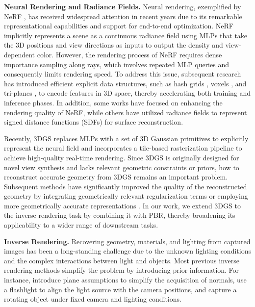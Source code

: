 \documentclass{article} %
\begin{document}
\textbf{Neural Rendering and Radiance Fields.} Neural rendering, exemplified by NeRF \citep{mildenhall2021nerf}, has received widespread attention in recent years due to its remarkable representational capabilities and support for end-to-end optimization. NeRF implicitly represents a scene as a continuous radiance field using MLPs that take the 3D positions and view directions as inputs to output the density and view-dependent color. However, the rendering process of NeRF requires dense importance sampling along rays, which involves repeated MLP queries and consequently limits rendering speed. To address this issue, subsequent research has introduced efficient explicit data structures, such as hash grids \citep{ingp}, voxels \citep{DVGO, fridovich2022plenoxels}, and tri-planes \citep{chen2022tensorf}, to encode features in 3D space, thereby accelerating both training and inference phases. In addition, some works \citep{barron2021mip, barron2022mip, barron2023zip} have focused on enhancing the rendering quality of NeRF, while others \citep{wang2021neus, volsdf} have utilized radiance fields to represent signed distance functions (SDFs) for surface reconstruction.

Recently, 3DGS \citep{3dgs} replaces MLPs with a set of 3D Gaussian primitives to explicitly represent the neural field and incorporates a tile-based rasterization pipeline to achieve high-quality real-time rendering. Since 3DGS is originally designed for novel view synthesis and lacks relevant geometric constraints or priors, how to reconstruct accurate geometry from 3DGS remains an important problem. Subsequent methods have significantly improved the quality of the reconstructed geometry by integrating geometrically relevant regularization terms \citep{guedon2024sugar} or employing more geometrically accurate representations \citep{2dgs,gaussiansurfel}. 
In our work, we extend 3DGS to the inverse rendering task by combining it with PBR, thereby broadening its applicability to a wider range of downstream tasks.

\textbf{Inverse Rendering.} Recovering geometry, materials, and lighting from captured images has been a long-standing challenge due to the unknown lighting conditions and the complex interactions between light and objects. Most previous inverse rendering methods simplify the problem by introducing prior information. For instance, \citet{barron2014shape, single} introduce plane assumptions to simplify the acquisition of normals, \citet{flashlight, practical} use a flashlight to align the light source with the camera positions, and \citet{recovering} capture a rotating object under fixed camera and lighting conditions. 
\end{document}
